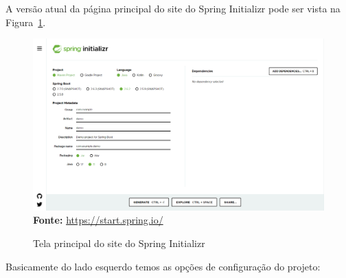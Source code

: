 A versão atual da página principal do site do Spring Initializr pode ser vista na Figura~\ref{fig:cap10SpringInitializr}.

\FloatBarrier
\begin{figure}[!htbp]
    \centering
    \caption{Tela principal do site do Spring Initializr}
    \includegraphics[scale=0.4]{imagens/cap10SpringInitializr}
    \\\textbf{Fonte:} \url{https://start.spring.io/}
    \label{fig:cap10SpringInitializr}
\end{figure}
\FloatBarrier

Basicamente do lado esquerdo temos as opções de configuração do projeto:

